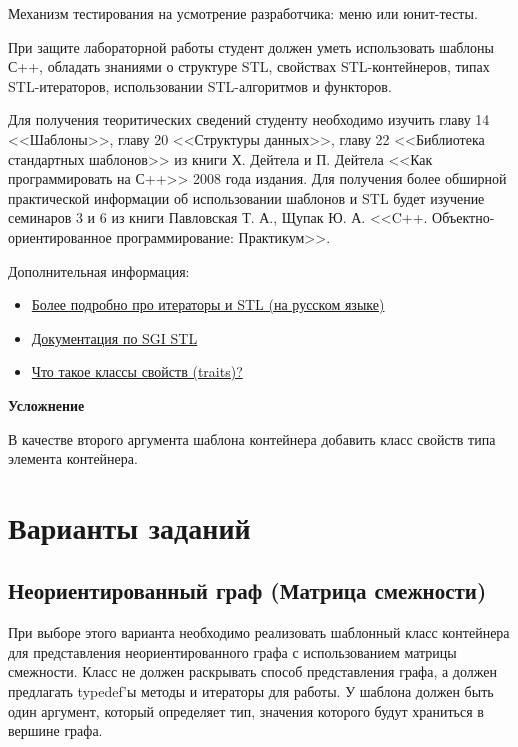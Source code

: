 \documentclass[a4paper,12pt]{article}
\begin{document}
Механизм тестирования на усмотрение разработчика: меню или юнит-тесты.

При защите лабораторной работы студент должен уметь использовать
шаблоны С++, обладать знаниями о структуре STL, свойствах
STL-контейнеров, типах STL-итераторов, использовании STL-алгоритмов и
функторов.

Для получения теоритических сведений студенту необходимо изучить главу
14 <<Шаблоны>>, главу 20 <<Структуры данных>>, главу 22 <<Библиотека
стандартных шаблонов>> из книги Х. Дейтела и П. Дейтела <<Как
программировать на С++>> 2008 года издания.  Для получения более
обширной практической информации об использовании шаблонов и STL будет
изучение семинаров 3 и 6 из книги Павловская Т. А., Щупак
Ю. А. <<C++. Объектно-ориентированное программирование: Практикум>>.

Дополнительная информация:

\begin{itemize}
\item
  \href{http://www.solarix.ru/for_developers/cpp/stl/stl.shtml#IDAPMBEJ}{Более
    подробно про итераторы и STL (на русском языке)}
\item \href{http://www.sgi.com/tech/stl/index.html}{Документация по
    SGI STL}
\item
  \href{http://www.cyberguru.ru/programming/cpp/cpp-traits.html}{Что
    такое классы свойств (traits)?}
\end{itemize}

\textbf{Усложнение}

В качестве второго аргумента шаблона контейнера добавить класс свойств
типа элемента контейнера.

\section{Варианты заданий}
\label{sec:Variants}

\subsection{Неориентированный граф (Матрица смежности)}
\label{sec:Variant_undir_graph_adj_matrix}

При выборе этого варианта необходимо реализовать шаблонный класс
контейнера для представления неориентированного графа с использованием
матрицы смежности. Класс не должен раскрывать способ представления
графа, а должен предлагать typedef’ы методы и итераторы для работы. У
шаблона должен быть один аргумент, который определяет тип, значения
которого будут храниться в вершине графа.
\end{document}
